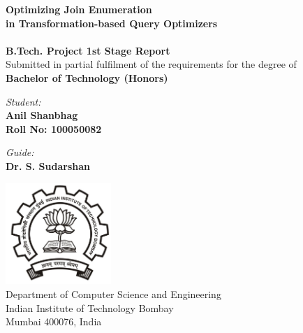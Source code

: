 \begin{titlepage}
\begin{center}

{\Huge \bfseries
Optimizing Join Enumeration \\
in Transformation-based Query Optimizers\\
}~\\[1cm]


{\large \bfseries
B.Tech. Project 1st Stage Report
}~\\[0.40cm]

{
Submitted in partial fulfilment of the requirements for the degree of
}~\\[0.20cm]

{\large \bfseries
Bachelor of Technology (Honors)
}\\[2.75cm]
\end{center}

\begin{multicols}{2}
\begin{flushleft}
{\large
\textit{Student:} \\
\textbf{Anil Shanbhag} \\
\textbf{Roll No: 100050082}
}
\end{flushleft}
\columnbreak
\begin{flushright}
{\large
\textit{Guide:} \\
\textbf{Dr. S. Sudarshan}
}
\end{flushright}
\end{multicols}

\vfill

\begin{center}
\includegraphics[width=4cm]{Figures/iitbblack.jpg}~\\[1cm]

{\large
Department of Computer Science and Engineering\\
Indian Institute of Technology Bombay\\
Mumbai 400076, India\\
}

\end{center}
\end{titlepage}